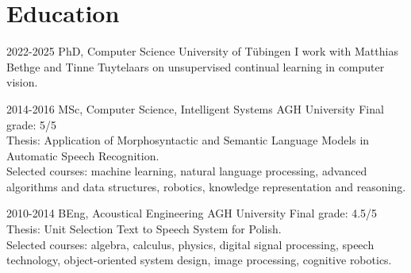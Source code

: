\documentclass[]{friggeri-cv_osx}
\begin{document}
\section{Education}
\begin{entrylist}

\entry
{2022-2025}
{PhD, Computer Science}
{University of Tübingen}
{I work with Matthias Bethge and Tinne Tuytelaars on unsupervised continual learning in computer vision.\\}

\entry
{2014-2016}
{MSc, Computer Science, Intelligent Systems}
{AGH University}
{Final grade: 5/5\\
Thesis: Application of Morphosyntactic and Semantic Language Models in Automatic Speech Recognition.\\
Selected courses: machine learning, natural language processing, advanced algorithms and data structures, robotics, knowledge representation and reasoning.\\}

\entry
{2010-2014}
{BEng, Acoustical Engineering}
{AGH University}
{Final grade: 4.5/5\\
Thesis: Unit Selection Text to Speech System for Polish.\\
Selected courses: algebra, calculus, physics, digital signal processing, speech technology, object-oriented system design, image processing, cognitive robotics.}
\end{entrylist}


\newpage
\end{document}
